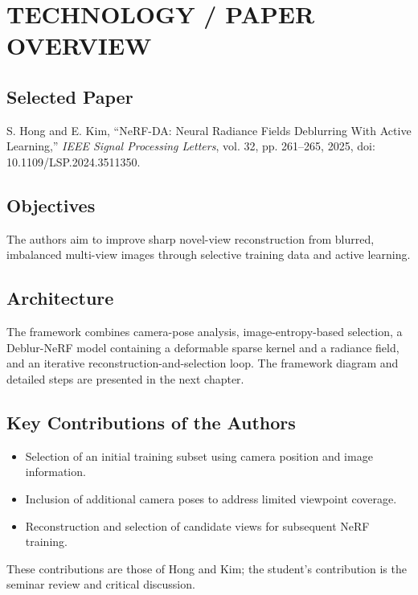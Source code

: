 \chapter{\MakeUppercase{Technology / Paper Overview}}
\setcounter{equation}{0}

\section{Selected Paper}
S. Hong and E. Kim, ``NeRF-DA: Neural Radiance Fields Deblurring With Active Learning,'' \textit{IEEE Signal Processing Letters}, vol. 32, pp. 261--265, 2025, doi: 10.1109/LSP.2024.3511350.\cite{bib1}
\section{Objectives}
The authors aim to improve sharp novel-view reconstruction from blurred, imbalanced multi-view images through selective training data and active learning.
\section{Architecture}
The framework combines camera-pose analysis, image-entropy-based selection, a Deblur-NeRF model containing a deformable sparse kernel and a radiance field, and an iterative reconstruction-and-selection loop. The framework diagram and detailed steps are presented in the next chapter.
\section{Key Contributions of the Authors}
\begin{itemize}
\item Selection of an initial training subset using camera position and image information.
\item Inclusion of additional camera poses to address limited viewpoint coverage.
\item Reconstruction and selection of candidate views for subsequent NeRF training.
\end{itemize}
These contributions are those of Hong and Kim; the student's contribution is the seminar review and critical discussion.\cite{bib1}
